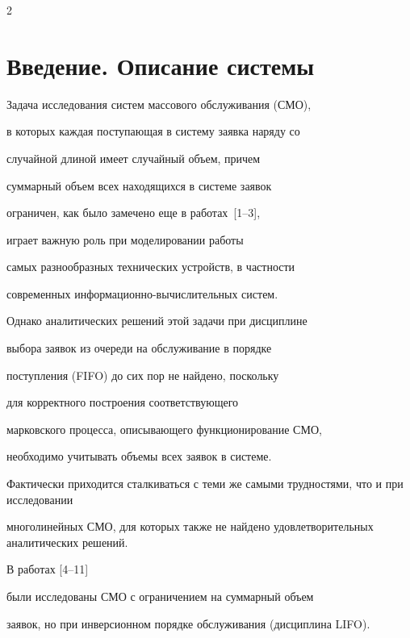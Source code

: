       \begin{multicols}{2}





            \label{st\stat}





\section{Введение. Описание системы}





Задача исследования систем массового обслуживания (СМО),


в которых каждая поступающая в систему заявка наряду со


случайной длиной имеет случайный объем, причем


суммарный объем всех находящихся в системе заявок


ограничен, как было замечено еще в работах~[1--3],


играет важную роль при моделировании работы


самых разнообразных технических устройств, в част\-ности


современных ин\-фор\-ма\-ци\-он\-но-вы\-чис\-ли\-тель\-ных сис\-тем.


Однако аналитических решений этой задачи при дисциплине


выбора заявок из очереди на обслуживание в порядке


поступления (FIFO) до сих пор не найдено, поскольку


для корректного построения соответствующего


марковского процесса, описывающего функционирование СМО,


необходимо учитывать объемы всех заявок в сис\-те\-ме.


Фактически приходится сталкиваться с теми же самыми трудностями, что и при исследовании


многолинейных СМО, для которых также не найдено удовлетворительных аналитических решений.





В работах [4--11]


были исследованы СМО с ограничением на суммарный объем


заявок, но при инверсионном порядке обслуживания (дисциплина LIFO).



\end{multicols}
